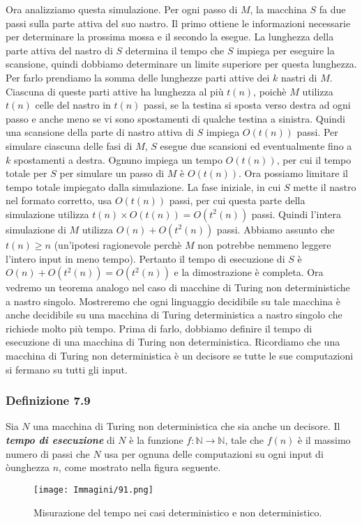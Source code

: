 \documentclass{article}
\begin{document}
Ora analizziamo questa simulazione.
Per ogni passo di $M$, la macchina $S$ fa due passi sulla parte attiva del suo nastro.
Il primo ottiene le informazioni necessarie per determinare la prossima mossa e il secondo la esegue.
La lunghezza della parte attiva del nastro di $S$ determina il tempo che $S$ impiega per eseguire la scansione, quindi dobbiamo determinare un limite superiore per questa lunghezza.
Per farlo prendiamo la somma delle lunghezze parti attive dei $k$ nastri di $M$.
Ciascuna di queste parti attive ha lunghezza al più $t(n)$, poichè $M$ utilizza $t(n)$ celle del nastro in $t(n)$ passi, se la testina si sposta verso destra ad ogni passo e anche meno se vi sono spostamenti di qualche testina a sinistra.
Quindi una scansione della parte di nastro attiva di $S$ impiega $O(t(n))$ passi.
Per simulare ciascuna delle fasi di $M$, $S$ esegue due scansioni ed eventualmente fino a $k$ spostamenti a destra.
Ognuno impiega un tempo $O(t(n))$, per cui il tempo totale per $S$ per simulare un passo di $M$ è $O(t(n))$.
Ora possiamo limitare il tempo totale impiegato dalla simulazione.
La fase iniziale, in cui $S$ mette il nastro nel formato corretto, usa $O(t(n))$ passi, per cui questa parte della simulazione utilizza $t(n) \times O(t(n)) = O(t^2(n))$ passi.
Quindi l'intera simulazione di $M$ utilizza $O(n) + O(t^2(n))$ passi.
Abbiamo assunto che $t(n) \geq n$ (un'ipotesi ragionevole perchè $M$ non potrebbe nemmeno leggere l'intero input in meno tempo). 
Pertanto il tempo di esecuzione di $S$ è $O(n) + O(t^2(n)) = O(t^2(n))$ e la dimostrazione è completa.
\vspace{1em}
\text{}
\newline
Ora vedremo un teorema analogo nel caso di macchine di Turing non deterministiche a nastro singolo.
Mostreremo che ogni linguaggio decidibile su tale macchina è anche decidibile su una macchina di Turing deterministica a nastro singolo che richiede molto più tempo.
Prima di farlo, dobbiamo definire il tempo di esecuzione di una macchina di Turing non deterministica.
Ricordiamo che una macchina di Turing non deterministica è un decisore se tutte le sue computazioni si fermano su tutti gli input.

\subsubsection{Definizione 7.9}
\label{definizione-7.9}
\begin{tcolorbox}[colback=yellow!10!white, colframe=yellow!50!black, title=Definizione 7.9]
    Sia $N$ una macchina di Turing non deterministica che sia anche un decisore.
    Il \textbf{\textit{tempo di esecuzione}} di $N$ è la funzione $f : \mathbb{N} \rightarrow \mathbb{N}$, tale che $f(n)$ è il massimo numero di passi che $N$ usa per ognuna delle computazioni su ogni input di òunghezza $n$, come mostrato nella figura seguente.
\end{tcolorbox}
\begin{figure}[H]
    \centering
    \texttt{[image: Immagini/91.png]}
    \caption{Misurazione del tempo nei casi deterministico e non deterministico.}
    \label{fig:example_O_grande}
\end{figure}
\end{document}

